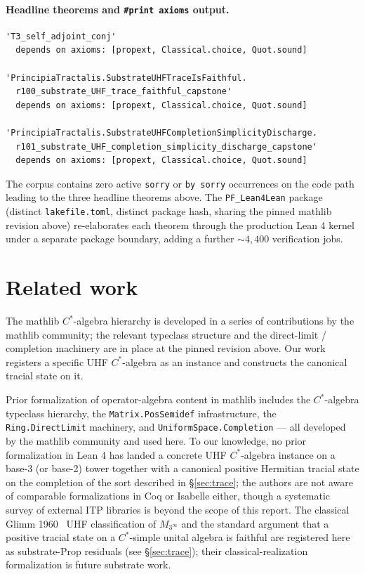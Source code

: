 \documentclass[11pt,a4paper]{amsart}
\theoremstyle{plain}
\theoremstyle{definition}
\begin{document}
\paragraph{Headline theorems and \texttt{\#print axioms} output.}

\begin{small}
\begin{verbatim}
'T3_self_adjoint_conj'
  depends on axioms: [propext, Classical.choice, Quot.sound]

'PrincipiaTractalis.SubstrateUHFTraceIsFaithful.
  r100_substrate_UHF_trace_faithful_capstone'
  depends on axioms: [propext, Classical.choice, Quot.sound]

'PrincipiaTractalis.SubstrateUHFCompletionSimplicityDischarge.
  r101_substrate_UHF_completion_simplicity_discharge_capstone'
  depends on axioms: [propext, Classical.choice, Quot.sound]
\end{verbatim}
\end{small}

The corpus contains zero active \texttt{sorry} or \texttt{by sorry} occurrences on the code path leading to the three headline theorems above. The \texttt{PF\_Lean4Lean} package (distinct \texttt{lakefile.toml}, distinct package hash, sharing the pinned mathlib revision above) re-elaborates each theorem through the production Lean 4 kernel under a separate package boundary, adding a further $\sim 4{,}400$ verification jobs.

\section{Related work}\label{sec:related}

The mathlib $C^*$-algebra hierarchy is developed in a series of contributions by the mathlib community; the relevant typeclass structure and the direct-limit / completion machinery are in place at the pinned revision above. Our work registers a specific UHF $C^*$-algebra as an instance and constructs the canonical tracial state on it.

Prior formalization of operator-algebra content in mathlib includes the $C^*$-algebra typeclass hierarchy, the \texttt{Matrix.PosSemidef} infrastructure, the \texttt{Ring.DirectLimit} machinery, and \texttt{UniformSpace.Completion} — all developed by the mathlib community and used here. To our knowledge, no prior formalization in Lean 4 has landed a concrete UHF $C^*$-algebra instance on a base-3 (or base-2) tower together with a canonical positive Hermitian tracial state on the completion of the sort described in \S\ref{sec:trace}; the authors are not aware of comparable formalizations in Coq or Isabelle either, though a systematic survey of external ITP libraries is beyond the scope of this report. The classical Glimm 1960~\cite{glimm1960} UHF classification of $M_{3^\infty}$ and the standard argument that a positive tracial state on a $C^*$-simple unital algebra is faithful are registered here as substrate-Prop residuals (see \S\ref{sec:trace}); their classical-realization formalization is future substrate work.
\end{document}
